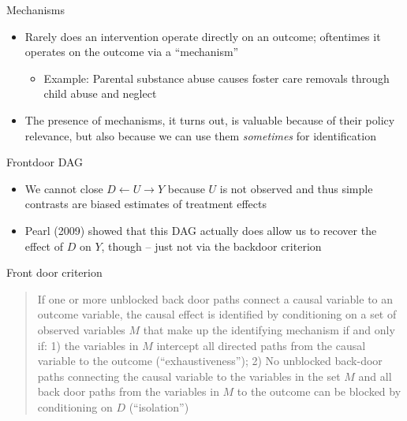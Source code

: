 \documentclass{beamer}
\begin{document}
\begin{frame}{Mechanisms}

  \begin{itemize}
    \item Rarely does an intervention operate directly on an outcome; oftentimes it operates on the outcome via a ``mechanism''
          \begin{itemize}
            \item Example: Parental substance abuse causes foster care removals through child abuse and neglect
          \end{itemize}
    \item The presence of mechanisms, it turns out, is valuable because of their policy relevance, but also because we can use them \emph{sometimes} for identification
  \end{itemize}

\end{frame}

\begin{frame}{Frontdoor DAG}

  \begin{center}
  \end{center}

  \begin{itemize}
    \item We cannot close $D \leftarrow U \rightarrow Y$ because $U$ is not observed and thus simple contrasts are biased estimates of treatment effects
    \item Pearl (2009) showed that this DAG actually does allow us to recover the effect of $D$ on $Y$, though -- just not via the backdoor criterion
  \end{itemize}

\end{frame}

\begin{frame}{Front door criterion}

  \begin{quote}
    If one or more unblocked back door paths connect a causal variable to an outcome variable, the causal effect is identified by conditioning on a set of observed variables $M$ that make up the identifying mechanism if and only if: 1) the variables in $M$ intercept all directed paths from the causal variable to the outcome (``exhaustiveness''); 2) No unblocked back-door paths connecting the causal variable to the variables in the set $M$ and all back door paths from the variables in $M$ to the outcome can be blocked by conditioning on $D$ (``isolation'')
  \end{quote}

\end{frame}
\end{document}
